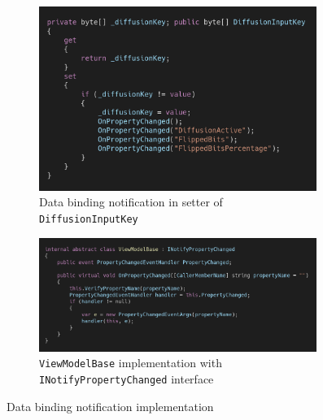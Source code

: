 \begin{figure}
\centering
\begin{subfigure}[t]{0.5\textwidth}
\centering
\includegraphics[width=0.99\textwidth]{figures/code/mvvm-arch/onpropertychanged.png}
\caption{Data binding notification in setter of \texttt{DiffusionInputKey}}
\label{fig:mvvm.onpropertychanged}
\end{subfigure}%
\begin{subfigure}[t]{0.5\textwidth}
\centering
\includegraphics[width=0.99\textwidth]{figures/code/mvvm-arch/viewmodelbase.png}
\caption{\texttt{ViewModelBase} implementation with \texttt{INotifyPropertyChanged} interface}
\label{fig:mvvm.viewmodelbase}
\end{subfigure}
\caption{Data binding notification implementation}
\label{fig:mvvm.databindingnotification}
\end{figure}


